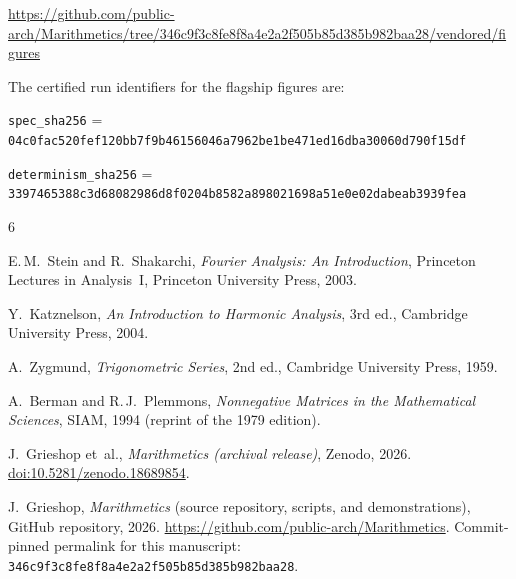 \documentclass[11pt,a4paper]{article}
\theoremstyle{plain}
\theoremstyle{definition}
\theoremstyle{plain}
\begin{document}
\smallskip
\noindent
\url{https://github.com/public-arch/Marithmetics/tree/346c9f3c8fe8f8a4e2a2f505b85d385b982baa28/vendored/figures}

\smallskip
\noindent
The certified run identifiers for the flagship figures are:

\smallskip
\noindent
\texttt{spec\_sha256} =
\texttt{04c0fac520fef120bb7f9b46156046a7962be1be471ed16dba30060d790f15df}

\noindent
\texttt{determinism\_sha256} =
\texttt{3397465388c3d68082986d8f0204b8582a898021698a51e0e02dabeab3939fea}


\begin{thebibliography}{6}

E.\,M.~Stein and R.~Shakarchi,
\textit{Fourier Analysis: An Introduction},
Princeton Lectures in Analysis~I,
Princeton University Press, 2003.

Y.~Katznelson,
\textit{An Introduction to Harmonic Analysis},
3rd ed.,
Cambridge University Press, 2004.

A.~Zygmund,
\textit{Trigonometric Series},
2nd ed.,
Cambridge University Press, 1959.

A.~Berman and R.\,J.~Plemmons,
\textit{Nonnegative Matrices in the Mathematical Sciences},
SIAM, 1994 (reprint of the 1979 edition).

J.~Grieshop et~al.,
\textit{Marithmetics (archival release)},
Zenodo, 2026.
\href{https://doi.org/10.5281/zenodo.18689854}{doi:10.5281/zenodo.18689854}.

J.~Grieshop,
\textit{Marithmetics} (source repository, scripts, and demonstrations),
GitHub repository, 2026.
\url{https://github.com/public-arch/Marithmetics}.
Commit-pinned permalink for this manuscript:
\texttt{346c9f3c8fe8f8a4e2a2f505b85d385b982baa28}.

\end{thebibliography}
\end{document}

